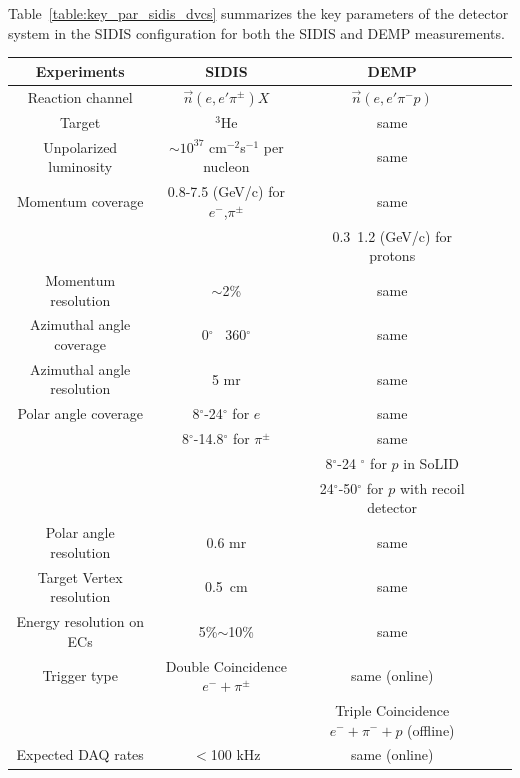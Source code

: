 Table~\ref{table:key_par_sidis_dvcs} summarizes the key parameters of the
detector system in the SIDIS configuration for both the SIDIS and DEMP
measurements.
\begin{table}\centering
\begin{tabular}{|c|c|c|c|c|}
\hline
Experiments                & SIDIS                    & DEMP  \\\hline
Reaction channel           & $\vec{n}(e,e'\pi^{\pm})X$ & $\vec{n}(e,e'\pi^{-}p)$	\\\hline
Target                     & $^3$He                   &same 	\\\hline
Unpolarized luminosity     & $\sim10^{37}$ cm$^{-2}$s$^{-1}$ per nucleon & same	\\\hline 
Momentum coverage          & 0.8-7.5 (GeV/c) for  $e^-$,$\pi^{\pm}$           &same 	\\
          										&   & 0.3~1.2 (GeV/c) for protons	\\\hline
Momentum resolution        & $\sim$2\%                & same\\\hline
Azimuthal angle coverage   & 0$^{\circ}$ ~360$^{\circ}$ & same	\\\hline
Azimuthal angle resolution & 5 mr                     & same	\\\hline
Polar angle coverage       & 8$^{\circ}$-24$^{\circ}$ for $e$ &  same \\
       & 8$^{\circ}$-14.8$^{\circ}$ for $\pi^{\pm}$  &  same 	\\
                           &                          & 8$^{\circ}$-24
                                                        $^{\circ}$ for $p$ in SoLID\\
                           &                          & 24$^{\circ}$-50$^{\circ}$ for $p$ with recoil detector         \\\hline
Polar angle resolution     & 0.6 mr                   & same	\\\hline
Target Vertex resolution   & 0.5~cm                   & same \\\hline
 Energy resolution on ECs  & 5\%$\sim$10\%            & same   \\\hline
Trigger type               & Double Coincidence $e^-+\pi^{\pm}$ & same (online)\\
              &  & Triple Coincidence $e^-+\pi^{-}+p$ (offline)\\\hline

Expected DAQ rates         &  $<$100 kHz              &  same (online)\\\hline


\end{tabular}
\end{table}
